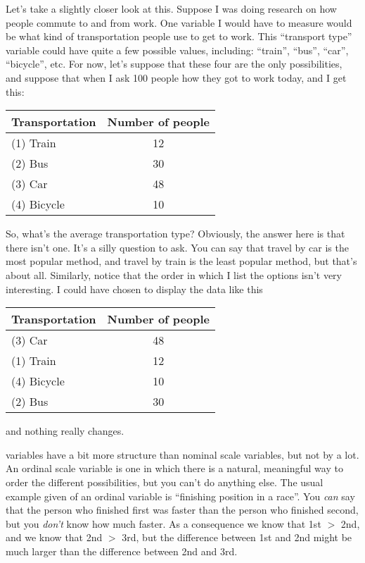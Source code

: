 Let's take a slightly closer look at this. Suppose I was doing research on how people commute to and from work. One variable I would have to measure would be what kind of transportation people use to get to work. This ``transport type'' variable could have quite a few possible values, including: ``train'', ``bus'', ``car'', ``bicycle'', etc. For now, let's suppose that these four are the only possibilities, and suppose that when I ask 100 people how they got to work today, and I get this:
 
 \vspace*{6pt}
 \begin{tabular}{lc}
Transportation & Number of people \\ \hline
 (1) Train & 12 \\
 (2) Bus & 30 \\
 (3) Car & 48 \\
 (4) Bicycle & 10 \\
 \hline
 \end{tabular}
 \vspace*{6pt}
 
 \noindent 
So, what's the average transportation type? Obviously, the answer here is that there isn't one. It's a silly question to ask. You can say that travel by car is the most popular method, and travel by train is the least popular method, but that's about all. Similarly, notice that the order in which I list the options isn't very interesting. I could have chosen to display the data like this
 
  \vspace*{6pt}
  \begin{tabular}{lc}
 Transportation & Number of people \\ \hline
(3) Car & 48 \\
(1) Train & 12 \\
(4) Bicycle & 10 \\
(2) Bus & 30 \\ \hline
 \end{tabular}
 \vspace*{6pt}
 
\noindent
and nothing really changes.


 variables have a bit more structure than nominal scale variables, but not by a lot. An ordinal scale variable is one in which there is a natural, meaningful way to order the different possibilities, but you can't do anything else. The usual example given of an ordinal variable is ``finishing position in a race''. You {\it can} say that the person who finished first was faster than the person who finished second, but you {\it don't} know how much faster. As a consequence we know that 1st $>$ 2nd, and we know that 2nd $>$ 3rd, but the difference between 1st and 2nd might be much larger than the difference between 2nd and 3rd.

